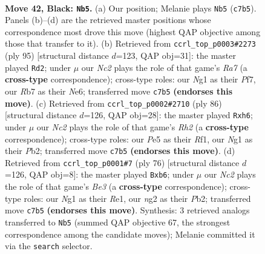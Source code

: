 \documentclass[11pt]{article}
\begin{document}
\clearpage

\begin{figure}[p]\centering
\begin{subfigure}{0.46\textwidth}\centering
\resizebox{\linewidth}{!}{%
\newchessgame
\chessboard[
  setfen={1r3bk1/1rn2p2/2Q5/4p3/R3P3/3KB3/3N1RN1/6nq b - - 9 42},
  showmover=false,
  pgfstyle=straightmove, color=movearrow, markmove={c7-b5}
]}
\caption{}
\end{subfigure}\hfill
\begin{subfigure}{0.46\textwidth}\centering
\resizebox{\linewidth}{!}{%
\newchessgame
\chessboard[
  setfen={4r1k1/1q3p2/2N1n1p1/1P2p1b1/2Q1P3/5R2/r5BP/1R5K b - - 2 48},
  showmover=false,
  pgfstyle=straightmove, color=movearrow, markmove={a2-d2}
]}
\caption{}
\end{subfigure}
\\[4pt]
\begin{subfigure}{0.46\textwidth}\centering
\resizebox{\linewidth}{!}{%
\newchessgame
\chessboard[
  setfen={r5k1/3b1rn1/1p3PNq/4p3/p1P1p1p1/8/PP5R/5RK1 w - - 0 44},
  showmover=false,
  pgfstyle=straightmove, color=movearrow, markmove={h2-h6}
]}
\caption{}
\end{subfigure}\hfill
\begin{subfigure}{0.46\textwidth}\centering
\resizebox{\linewidth}{!}{%
\newchessgame
\chessboard[
  setfen={4r1k1/5p2/1n1r2b1/8/2p1P1p1/P3B3/1P1N2K1/3RR3 w - - 2 39},
  showmover=false,
  pgfstyle=straightmove, color=movearrow, markmove={e3-b6}
]}
\caption{}
\end{subfigure}
\caption{\textbf{Move 42, Black: \texttt{Nb5}.} (a) Our position; Melanie plays \texttt{Nb5} (\texttt{c7b5}). Panels (b)--(d) are the retrieved master positions whose correspondence most drove this move (highest QAP objective among those that transfer to it). (b) Retrieved from \texttt{ccrl\_top\_p0003\#2273} (ply 95) [structural distance $d$=123, QAP obj=31]: the master played \texttt{Rd2}; under $\mu$ our \emph{Nc2} plays the role of that game's \emph{Ra7} (a \textbf{cross-type} correspondence); cross-type roles: our \emph{N}g1 as their \emph{P}f7, our \emph{R}b7 as their \emph{N}e6; transferred move \texttt{c7b5} \textbf{(endorses this move)}. (c) Retrieved from \texttt{ccrl\_top\_p0002\#2710} (ply 86) [structural distance $d$=126, QAP obj=28]: the master played \texttt{Rxh6}; under $\mu$ our \emph{Nc2} plays the role of that game's \emph{Rh2} (a \textbf{cross-type} correspondence); cross-type roles: our \emph{P}e5 as their \emph{R}f1, our \emph{N}g1 as their \emph{P}b2; transferred move \texttt{c7b5} \textbf{(endorses this move)}. (d) Retrieved from \texttt{ccrl\_top\_p0001\#7} (ply 76) [structural distance $d$=126, QAP obj=8]: the master played \texttt{Bxb6}; under $\mu$ our \emph{Nc2} plays the role of that game's \emph{Be3} (a \textbf{cross-type} correspondence); cross-type roles: our \emph{N}g1 as their \emph{R}e1, our \emph{n}g2 as their \emph{P}b2; transferred move \texttt{c7b5} \textbf{(endorses this move)}. Synthesis: 3 retrieved analogs transferred to \texttt{Nb5} (summed QAP objective 67, the strongest correspondence among the candidate moves); Melanie committed it via the \texttt{search} selector.}
\label{fig:thought-m83}
\end{figure}
\end{document}
